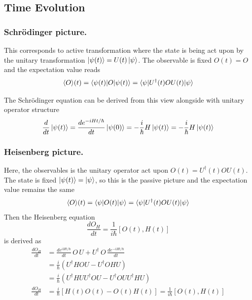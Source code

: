 \documentclass[../../../main.tex]{subfiles}
\begin{document}
\subsection{Time Evolution}
\subsubsection{Schrödinger picture.}
This corresponds to active transformation where the  state is being act upon by the unitary transformation $\ket{\psi (t)} =  U(t)\ket{\psi}$.
The observable is fixed $    O (t)= O$ and the expectation value reads 
\begin{equation*}
\langle O\rangle(t) = \langle\psi(t)|O|\psi(t)\rangle
=\braket{\psi | U ^\dagger (t)O U(t)|\psi}
\end{equation*}

The Schrödinger equation can be derived from this view alongside with unitary operator structure
\begin{equation*}
\frac{d}{dt}\ket{\psi(t)} = \frac{d e^{-iHt/\hbar}}{dt}\ket{\psi(0)}
= -\frac{i}{\hbar}H\ket{\psi(t)}
= -\frac{i}{\hbar}H\ket{\psi(t  )}
\end{equation*}


\subsubsection{Heisenberg picture.}
Here, the observables is the unitary operator act upon $O(t) = U ^\dagger (t)O U(t)$.
The state is fixed $\ket{\psi (t)} = \ket{\psi}$, so this is the passive picture and the expectation value remains the same
\begin{equation*}
\langle O\rangle(t) = \langle\psi|O(t)|\psi\rangle
=\braket{\psi | U ^\dagger (t)O U(t)|\psi}
\end{equation*}
Then the Heisenberg equation 
\begin{equation*}
    \frac{dO_H}{dt}     =  \frac{1}{i \hbar} [O(t),H(t)]
\end{equation*}
is derived as 
\begin{align*}
    \frac{dO_H}{dt} 
    & =  \frac{de^{iHt/\hbar}}{dt}\,O\,U + U^\dagger\,O\,\frac{de^{-iHt/\hbar}}{dt}\\
    & =  \frac{i}{\hbar} (U ^\dagger H O U - U ^\dagger O H U)\\
    & =  \frac{i}{\hbar} (U ^\dagger H U U ^\dagger O U - U ^\dagger O U U ^\dagger H U)\\
    \frac{dO_H}{dt} 
    & =  \frac{i}{\hbar} [H(t) O(t) - O(t) H(t)]  =  \frac{1}{i \hbar} [O(t),H(t)]\\
\end{align*}
\end{document}
